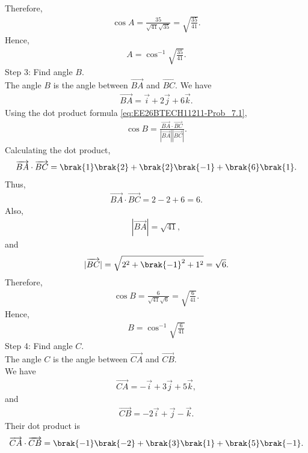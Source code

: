 \begin{enumerate}[label=\thesubsection.\arabic*, ref=\thesubsection.\theenumi]
Therefore,
\begin{align}
\cos A=\frac{35}{\sqrt{41}\sqrt{35}}
=\sqrt{\frac{35}{41}}.
\end{align}
Hence,
\begin{align}
A=\cos^{-1}\sqrt{\frac{35}{41}}.
\end{align}
{Step 3: Find angle $B$.}
\\The angle $B$ is the angle between
$\overrightarrow{BA}$ and $\overrightarrow{BC}$.
We have
\begin{align}
\overrightarrow{BA}
=\vec{i}+2\vec{j}+6\vec{k}.
\end{align}
Using the dot product formula \eqref{eq:EE26BTECH11211-Prob_7.1},
\begin{align}
\cos B=
\frac{\overrightarrow{BA}\cdot\overrightarrow{BC}}
{|\overrightarrow{BA}||\overrightarrow{BC}|}.
\end{align}
Calculating the dot product,
\begin{align}
\overrightarrow{BA}\cdot\overrightarrow{BC}
=\brak{1}\brak{2}+\brak{2}\brak{-1}+\brak{6}\brak{1}.
\end{align}
Thus,
\begin{align}
\overrightarrow{BA}\cdot\overrightarrow{BC}
=2-2+6=6.
\end{align}
Also,
\begin{align}
|\overrightarrow{BA}|=\sqrt{41},
\end{align}
and
\begin{align}
|\overrightarrow{BC}|
=\sqrt{2^2+\brak{-1}^2+1^2}
=\sqrt{6}.
\end{align}
Therefore,
\begin{align}
\cos B=\frac{6}{\sqrt{41}\sqrt{6}}
=\sqrt{\frac{6}{41}}.
\end{align}
Hence,
\begin{align}
B=\cos^{-1}\sqrt{\frac{6}{41}}
\end{align}
{Step 4: Find angle $C$.}
\\The angle $C$ is the angle between
$\overrightarrow{CA}$ and $\overrightarrow{CB}$.
\\We have
\begin{align}
\overrightarrow{CA}
=-\vec{i}+3\vec{j}+5\vec{k},
\end{align}
and
\begin{align}
\overrightarrow{CB}
=-2\vec{i}+\vec{j}-\vec{k}.
\end{align}
Their dot product is
\begin{align}
\overrightarrow{CA}\cdot\overrightarrow{CB}
=\brak{-1}\brak{-2}+\brak{3}\brak{1}+\brak{5}\brak{-1}.

\end{align}
\end{enumerate}
